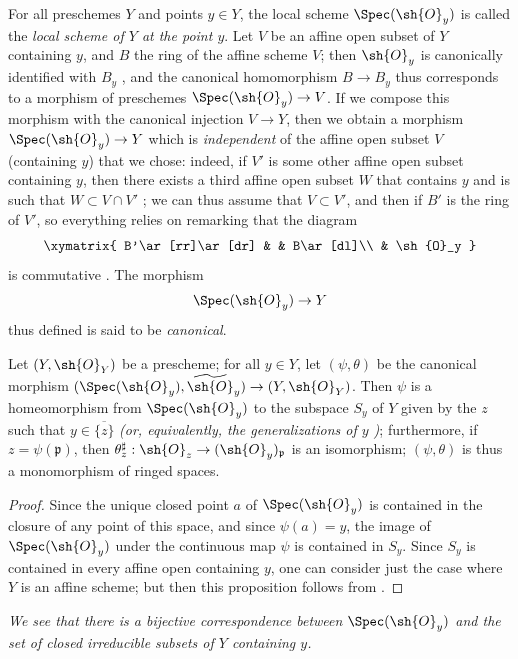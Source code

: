 For all preschemes $Y$ and points $y\in Y$, the local scheme $\Spec(\sh{O}_y)$
is called the \emph{local scheme of $Y$ at the point $y$}.
Let $V$ be an affine open subset of $Y$ containing $y$, and $B$ the ring of the affine scheme $V$;
then $\sh{O}_y$ is canonically identified with $B_y$ , and the canonical homomorphism $B\to B_y$ thus corresponds  to a morphism of preschemes $\Spec(\sh{O}_y)\to V$.
If we compose this morphism with the canonical injection $V\to Y$, then we obtain a morphism $\Spec(\sh{O}_y)\to Y$ which is \emph{independent} of the affine open subset $V$ (containing $y$) that we chose: indeed, if $V'$ is some other affine open subset containing $y$, then there exists a third affine open subset $W$ that contains $y$ and is such that $W\subset V\cap V'$ ;
we can thus assume that $V\subset V'$, and then if $B'$ is the ring of $V'$, so everything relies on remarking that the diagram
\[
  \xymatrix{
    B'\ar[rr]\ar[dr] & &
    B\ar[dl]\\
    & \sh{O}_y
  }
\]
is commutative .
The morphism
\[
  \Spec(\sh{O}_y)\to Y
\]
thus defined is said to be {\it canonical}.

\begin{proposition}[2.4.2]
\label{I.2.4.2}
Let $(Y,\sh{O}_Y)$ be a prescheme;
for all $y\in Y$, let $(\psi,\theta)$ be the canonical morphism $(\Spec(\sh{O}_y),\widetilde{\sh{O}}_y)\to(Y,\sh{O}_Y)$.
Then $\psi$ is a homeomorphism from $\Spec(\sh{O}_y)$ to the subspace $S_y$ of $Y$ given by the $z$ such that $y\in\overline{\{z\}}$ \emph{(or, equivalently, the \emph{generalizations} of $y$ )};
furthermore, if $z=\psi(\mathfrak{p})$, then $\theta_z^\sharp:\sh{O}_z\to(\sh{O}_y)_\mathfrak{p}$ is an isomorphism;
$(\psi,\theta)$ is thus a monomorphism of ringed spaces.
\end{proposition}

\begin{proof}
Since the unique closed point $a$ of $\Spec(\sh{O}_y)$ is contained in the closure of any point of this space, and since $\psi(a)=y$, the image of $\Spec(\sh{O}_y)$ under the continuous map $\psi$ is contained in $S_y$.
Since $S_y$ is contained in every affine open containing $y$, one can consider just the case where $Y$ is an affine scheme;
but then this proposition follows from .
\end{proof}

\emph{We see  that there is a bijective correspondence between $\Spec(\sh{O}_y)$ and the set of closed irreducible subsets of $Y$ containing $y$.}

